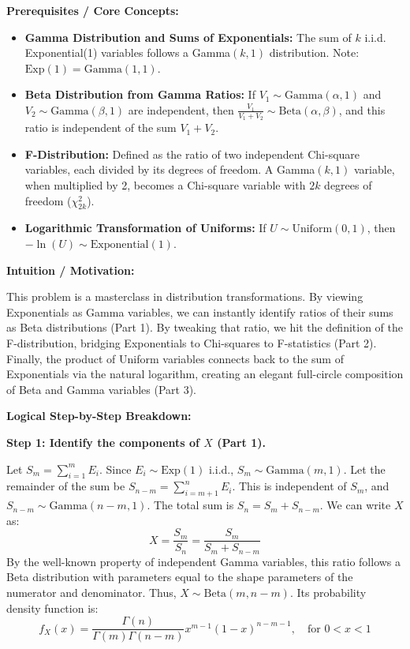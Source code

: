 \begin{solution}
\textbf{Prerequisites / Core Concepts:}
\begin{itemize}
    \item \textbf{Gamma Distribution and Sums of Exponentials:} The sum of $k$ i.i.d. Exponential(1) variables follows a Gamma$(k, 1)$ distribution. Note: $\text{Exp}(1) = \text{Gamma}(1, 1)$.
    \item \textbf{Beta Distribution from Gamma Ratios:} If $V_1 \sim \text{Gamma}(\alpha, 1)$ and $V_2 \sim \text{Gamma}(\beta, 1)$ are independent, then $\frac{V_1}{V_1+V_2} \sim \text{Beta}(\alpha, \beta)$, and this ratio is independent of the sum $V_1+V_2$.
    \item \textbf{F-Distribution:} Defined as the ratio of two independent Chi-square variables, each divided by its degrees of freedom. A Gamma$(k, 1)$ variable, when multiplied by 2, becomes a Chi-square variable with $2k$ degrees of freedom ($\chi^2_{2k}$).
    \item \textbf{Logarithmic Transformation of Uniforms:} If $U \sim \text{Uniform}(0,1)$, then $-\ln(U) \sim \text{Exponential}(1)$.
\end{itemize}

\textbf{Intuition / Motivation:}

This problem is a masterclass in distribution transformations. By viewing Exponentials as Gamma variables, we can instantly identify ratios of their sums as Beta distributions (Part 1). By tweaking that ratio, we hit the definition of the F-distribution, bridging Exponentials to Chi-squares to F-statistics (Part 2). Finally, the product of Uniform variables connects back to the sum of Exponentials via the natural logarithm, creating an elegant full-circle composition of Beta and Gamma variables (Part 3).

\textbf{Logical Step-by-Step Breakdown:}

\textbf{Step 1: Identify the components of $X$ (Part 1).}

Let $S_m = \sum_{i=1}^m E_i$. Since $E_i \sim \text{Exp}(1)$ i.i.d., $S_m \sim \text{Gamma}(m, 1)$.
Let the remainder of the sum be $S_{n-m} = \sum_{i=m+1}^n E_i$. This is independent of $S_m$, and $S_{n-m} \sim \text{Gamma}(n-m, 1)$.
The total sum is $S_n = S_m + S_{n-m}$.
We can write $X$ as:
\[ X = \frac{S_m}{S_n} = \frac{S_m}{S_m + S_{n-m}} \]
By the well-known property of independent Gamma variables, this ratio follows a Beta distribution with parameters equal to the shape parameters of the numerator and denominator.
Thus, $X \sim \text{Beta}(m, n-m)$.
Its probability density function is:
\[ f_X(x) = \frac{\Gamma(n)}{\Gamma(m)\Gamma(n-m)} x^{m-1} (1-x)^{n-m-1}, \quad \text{for } 0 < x < 1 \]


\end{solution}

